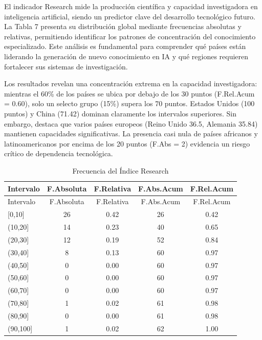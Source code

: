 \documentclass[
]{article}
\begin{document}
\begin{multicols}{2}
El indicador Research mide la producción científica y capacidad investigadora en inteligencia artificial, siendo un predictor clave del desarrollo tecnológico futuro. La Tabla 7 presenta su distribución global mediante frecuencias absolutas y relativas, permitiendo identificar los patrones de concentración del conocimiento especializado. Este análisis es fundamental para comprender qué países están liderando la generación de nuevo conocimiento en IA y qué regiones requieren fortalecer sus sistemas de investigación.

Los resultados revelan una concentración extrema en la capacidad investigadora: mientras el 60\% de los países se ubica por debajo de los 30 puntos (F.Rel.Acum = 0.60), solo un selecto grupo (15\%) supera los 70 puntos. Estados Unidos (100 puntos) y China (71.42) dominan claramente los intervalos superiores. Sin embargo, destaca que varios países europeos (Reino Unido 36.5, Alemania 35.84) mantienen capacidades significativas. La presencia casi nula de países africanos y latinoamericanos por encima de los 20 puntos (F.Abs = 2) evidencia un riesgo crítico de dependencia tecnológica.

\end{multicols}

\begin{longtable}[]{@{}lcccc@{}}
\caption{Frecuencia del Índice Research}\tabularnewline
\toprule\noalign{}
Intervalo & F.Absoluta & F.Relativa & F.Abs.Acum & F.Rel.Acum \\
\midrule\noalign{}
\endfirsthead
\toprule\noalign{}
Intervalo & F.Absoluta & F.Relativa & F.Abs.Acum & F.Rel.Acum \\
\midrule\noalign{}
\endhead
\bottomrule\noalign{}
\endlastfoot
{[}0,10{]} & 26 & 0.42 & 26 & 0.42 \\
(10,20{]} & 14 & 0.23 & 40 & 0.65 \\
(20,30{]} & 12 & 0.19 & 52 & 0.84 \\
(30,40{]} & 8 & 0.13 & 60 & 0.97 \\
(40,50{]} & 0 & 0.00 & 60 & 0.97 \\
(50,60{]} & 0 & 0.00 & 60 & 0.97 \\
(60,70{]} & 0 & 0.00 & 60 & 0.97 \\
(70,80{]} & 1 & 0.02 & 61 & 0.98 \\
(80,90{]} & 0 & 0.00 & 61 & 0.98 \\
(90,100{]} & 1 & 0.02 & 62 & 1.00 \\
\end{longtable}
\end{document}
